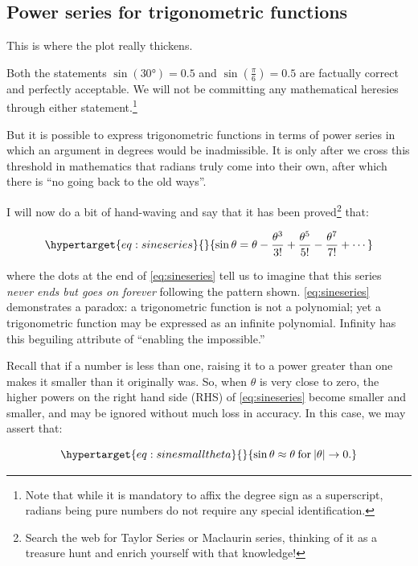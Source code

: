 \documentclass[
  a4paper,
]{article}
\begin{document}
\hypertarget{power-series-for-trigonometric-functions}{%
\subsection{Power series for trigonometric
functions}\label{power-series-for-trigonometric-functions}}

This is where the plot really thickens.

Both the statements \(\sin(30°)=0.5\) and \(\sin(\frac{\pi}{6})=0.5\)
are factually correct and perfectly acceptable. We will not be
committing any mathematical heresies through either
statement.\footnote{Note that while it is mandatory to affix the degree
  sign as a superscript, radians being pure numbers do not require any
  special identification.}

But it is possible to express trigonometric functions in terms of power
series in which an argument in degrees would be inadmissible. It is only
after we cross this threshold in mathematics that radians truly come
into their own, after which there is ``no going back to the old ways''.

I will now do a bit of hand-waving and say that it has been
proved\footnote{Search the web for Taylor Series or Maclaurin series,
  thinking of it as a treasure hunt and enrich yourself with that
  knowledge!} that:

\begin{equation}\protect\hypertarget{eq:sineseries}{}{
\sin\theta = \theta - \frac{\theta^3}{3!} + \frac{\theta^5}{5!} - \frac{\theta^7}{7!} + \cdots
}\label{eq:sineseries}\end{equation}

where the dots at the end of \cref{eq:sineseries} tell us to imagine
that this series \emph{never ends but goes on forever} following the
pattern shown. \cref{eq:sineseries} demonstrates a paradox: a
trigonometric function is not a polynomial; yet a trigonometric function
may be expressed as an infinite polynomial. Infinity has this beguiling
attribute of ``enabling the impossible.''

Recall that if a number is less than one, raising it to a power greater
than one makes it smaller than it originally was. So, when \(\theta\) is
very close to zero, the higher powers on the right hand side (RHS) of
\cref{eq:sineseries} become smaller and smaller, and may be ignored
without much loss in accuracy. In this case, we may assert that:

\begin{equation}\protect\hypertarget{eq:sinesmalltheta}{}{
\sin\theta\approx\theta \:\text{for}\: \lvert\theta\rvert \to 0.
}\label{eq:sinesmalltheta}\end{equation}
\end{document}
